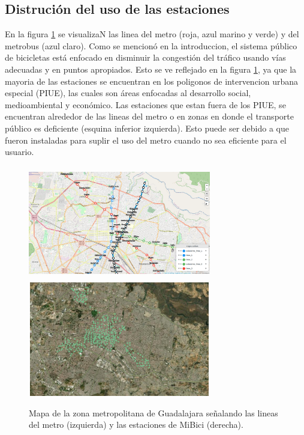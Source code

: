 \subsection{Distrución del uso de las estaciones}

En la figura \ref{fig:map_metro_stations} se visualizaN las linea del metro (roja, azul marino y verde) y del metrobus (azul claro). Como se mencionó en la introduccion, el sistema público de bicicletas está enfocado en disminuir la congestión del tráfico usando vías adecuadas y en puntos apropiados. Esto se ve reflejado en la figura \ref{fig:map_metro_stations}, ya que la mayoria de las estaciones se encuentran en los poligonos de intervencion urbana especial (PIUE), las cuales son áreas enfocadas al desarrollo social, medioambiental y económico\cite{poligono_2018}. Las estaciones que estan fuera de los PIUE, se encuentran alrededor de las lineas del metro o en zonas en donde el transporte público es deficiente (esquina inferior izquierda). Esto puede ser debido a que fueron instaladas para suplir el uso del metro cuando no sea eficiente para el usuario.

\begin{figure}[H]
    \centering
    \includegraphics[width=8cm,height=5cm]{Graphics/map_with_metro_lines.png}
    \includegraphics[width=8cm,height=5cm]{Graphics/stations.png}
    \caption{Mapa de la zona metropolitana de Guadalajara señalando las lineas del metro (izquierda) y las estaciones de MiBici (derecha).}
    \label{fig:map_metro_stations}
\end{figure}

